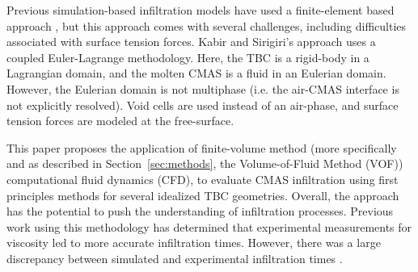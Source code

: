 \documentclass[%
 aip,
 amsmath,amssymb,
 reprint,%
floatfix]{revtex4-1}
\begin{document}

Previous simulation-based infiltration models have used a finite-element based approach \cite{Kabir, Sirigiri2018}, but this approach comes with several challenges, including difficulties associated with surface tension forces. Kabir and Sirigiri's approach uses a coupled Euler-Lagrange methodology. Here, the TBC is a rigid-body in a Lagrangian domain, and the molten CMAS is a fluid in an Eulerian domain. However, the Eulerian domain is not multiphase (i.e. the air-CMAS interface is not explicitly resolved). Void cells are used instead of an air-phase, and surface tension forces are modeled at the free-surface.

This paper proposes the application of finite-volume method (more specifically and as described in Section~\ref{sec:methods}, the Volume-of-Fluid Method (VOF)) computational fluid dynamics (CFD), to evaluate CMAS infiltration using first principles methods for several idealized TBC geometries. 
Overall, the approach has the potential to push the understanding of infiltration processes. Previous work using this methodology has determined that experimental measurements for viscosity led to more accurate infiltration times. However, there was a large discrepancy between simulated and experimental infiltration times \cite{Cavainolo2023}. 
\end{document}
